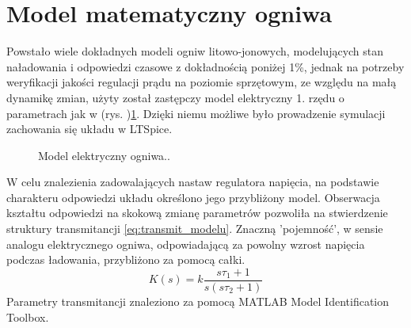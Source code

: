 \documentclass[polish,engineer]{polsl-msth}
\begin{document}
\section{Model matematyczny ogniwa}
Powstało wiele dokładnych modeli\cite{1634598_BATT_MODELS} ogniw litowo-jonowych, modelujących stan naładowania i odpowiedzi czasowe z dokładnością poniżej 1\%, jednak na potrzeby weryfikacji jakości regulacji prądu na poziomie sprzętowym, ze względu na małą dynamikę zmian, użyty został zastępczy model elektryczny 1. rzędu o parametrach jak w \cite{8759769_cellmodel1storder} (rys. )\ref{img:thevenin_model}. Dzięki niemu możliwe było prowadzenie symulacji zachowania się układu w LTSpice.
\begin{figure}[hbtp]
    \centering
     \caption{Model elektryczny ogniwa..\label{img:thevenin_model}}
\end{figure}

W celu znalezienia zadowalających nastaw regulatora napięcia, na podstawie charakteru odpowiedzi układu określono jego przybliżony model. Obserwacja kształtu odpowiedzi na skokową zmianę parametrów pozwoliła na stwierdzenie struktury transmitancji \ref{eq:transmit_modelu}. Znaczną 'pojemność', w sensie analogu elektrycznego ogniwa, odpowiadającą za powolny wzrost napięcia podczas ładowania, przybliżono za pomocą całki.
\begin{equation}
    K(s) = k\frac{s\tau_1 + 1}{s(s\tau_2 + 1)}
    \label{eq:transmit_modelu}
\end{equation}
Parametry transmitancji znaleziono za pomocą MATLAB Model Identification Toolbox.
\end{document}
